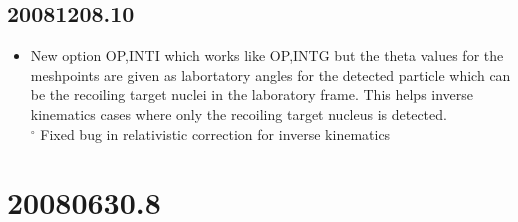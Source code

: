 \documentclass[10pt]{article}
\begin{document}
\subsection*{20081208.10}
\begin{itemize}
  \item New option OP,INTI which works like OP,INTG but the theta values for the meshpoints are given as labortatory angles for the detected particle which can be the recoiling target nuclei in the laboratory frame. This helps inverse kinematics cases where only the recoiling target nucleus is detected.\\
${ }^{\circ}$ Fixed bug in relativistic correction for inverse kinematics
\end{itemize}

\section*{20080630.8}
\end{document}
